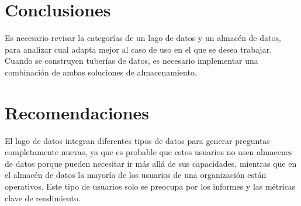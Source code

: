 \documentclass[twoside,twocolumn]{article}
\begin{document}
\section{Conclusiones}

Es necesario revisar la categorías de un lago de datos y un almacén de datos, para analizar cual adapta mejor al caso de uso en el que se desea trabajar.
Cuando se construyen tuberías de datos, es necesario implementar una combinación de ambas soluciones de almacenamiento.


\section{Recomendaciones}
 El lago de datos integran diferentes tipos de datos para generar preguntas completamente nuevas, ya que es probable que estos usuarios no usen almacenes de datos porque pueden necesitar ir más allá de sus capacidades, mientras que en el almacén de datos la mayoría de los usuarios de una organización están operativos. Este tipo de usuarios solo se preocupa por los informes y las métricas clave de rendimiento.

 
 
\end{document}
